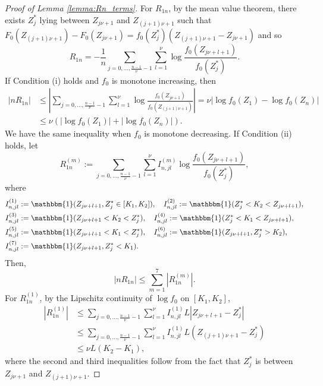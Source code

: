 \documentclass[12pt,letterpaper, twoside, openany]{article}
\theoremstyle{plain}
\begin{document}
\begin{proof}[Proof of Lemma \ref{lemma:Rn_terms}]
%
For $R_{1n}$, by the mean value theorem, there exists $Z^*_j$ lying between $Z_{j\nu+1}$ and $Z_{(j+1)\nu+1}$ such that $F_0(Z_{(j+1)\nu+1}) - F_0(Z_{j\nu+1}) = f_0(Z^*_j)(Z_{(j+1)\nu+1} - Z_{j\nu+1})$ and so
	\begin{equation*}
R_{1n}  = -\frac{1}{n}\sum_{j=0,\ldots, \frac{n-1}{\nu}-1} \sum^\nu_{l=1} \log \frac{f_0(Z_{j\nu+l+1})}{f_0(Z^*_j)}.
	\end{equation*}
 If Condition (i) holds and $f_0$ is monotone increasing, then
\begin{align}
    |n R_{1n}| & \leq \left|  \sum_{j=0,\ldots, \frac{n-1}{\nu}-1} \sum^\nu_{l=1} \log \frac{f_0(Z_{j\nu+1})}{f_0(Z_{(j+1)\nu+1})}\right| =\nu \left| \log f_0(Z_1) - \log f_0(Z_n)\right|\nonumber \\
    & \leq \nu (|\log f_0(Z_1)| + |\log f_0(Z_n)|). \label{eqnR_1n1}
\end{align}
We have the same inequality when $f_0$ is monotone decreasing.
If Condition (ii) holds, 
let 
\begin{equation*}
R^{(m)}_{1n} := \sum_{j=0,\ldots, \frac{n-1}{\nu}-1} \sum^\nu_{l=1} I^{(m)}_{n,jl} \log \frac{f_0(Z_{j\nu+l+1})}{f_0(Z^*_j)},
\end{equation*}
where 
\begin{align*}
    I^{(1)}_{n,jl} &:= \mathbbm{1}(Z_{j\nu+l+1}, Z^*_j \in [K_1,K_2]), \quad 
    I^{(2)}_{n,jl} := \mathbbm{1}( Z^*_j < K_2 < Z_{j\nu+l+1}),\\
    I^{(3)}_{n,jl} &:= \mathbbm{1}(  Z_{j\nu+l+1} < K_2 < Z^*_j), \quad 
    I^{(4)}_{n,jl}:=\mathbbm{1}( Z^*_j < K_1 < Z_{j\nu+l+1}),\\
    I^{(5)}_{n,jl} &:= \mathbbm{1}(  Z_{j\nu+l+1} < K_1 < Z^*_j), \quad 
    I^{(6)}_{n,jl} :=\mathbbm{1}(  Z_{j\nu+l+1}, Z^*_j > K_2),\\
    I^{(7)}_{n,jl} &:=\mathbbm{1}(  Z_{j\nu+l+1}, Z^*_j < K_1).
\end{align*}
Then,
\begin{equation*}
|nR_{1n}| \leq  \sum^7_{m=1}|R^{(m)}_{1n}|.
\end{equation*}
%
For $R^{(1)}_{1n}$, by the Lipschitz continuity of $\log f_0$ on $[K_1, K_2]$, 
\begin{align*}
    |R^{(1)}_{1n}|& \leq \sum_{j=0,\ldots, \frac{n-1}{\nu}-1} \sum^\nu_{l=1}  I^{(1)}_{n,jl} L \left| Z_{j\nu+l+1} - Z^*_j  \right|\\
    & \leq \sum_{j=0,\ldots, \frac{n-1}{\nu}-1} \sum^\nu_{l=1}  I^{(1)}_{n,jl} L(Z_{(j+1)\nu+1} - Z^*_j ) \\
    & \leq  \nu L(K_2 - K_1),
\end{align*}
where the second and third inequalities follow from the fact that $Z^*_j$ is between $Z_{j\nu+1}$ and $Z_{(j+1)\nu+1}$.


\end{proof}
\end{document}
